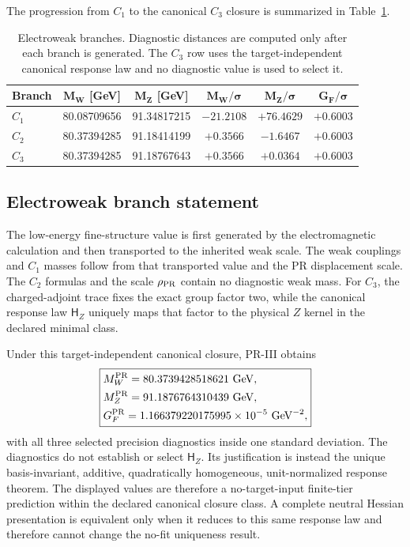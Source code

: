 \documentclass[11pt]{article}
\begin{document}
The progression from \(C_1\) to the canonical \(C_3\) closure is summarized in
Table~\ref{tab:priii-ew-closure-branches}.

\begin{table}[htbp]
\centering
\caption{Electroweak branches.  Diagnostic distances are computed only after each branch is generated.  The \(C_3\) row uses the target-independent canonical response law and no diagnostic value is used to select it.}
\label{tab:priii-ew-closure-branches}
\begin{tabular}{lccccc}
\toprule
\textbf{Branch}
& \(\boldsymbol{M_W}\) [GeV]
& \(\boldsymbol{M_Z}\) [GeV]
& \(\boldsymbol{M_W/\sigma}\)
& \(\boldsymbol{M_Z/\sigma}\)
& \(\boldsymbol{G_F/\sigma}\) \\
\midrule
\(C_1\)
& 80.08709656
& 91.34817215
& \(-21.2108\)
& \(+76.4629\)
& \(+0.6003\) \\
\(C_2\)
& 80.37394285
& 91.18414199
& \(+0.3566\)
& \(-1.6467\)
& \(+0.6003\) \\
\(C_3\)
& 80.37394285
& 91.18767643
& \(+0.3566\)
& \(+0.0364\)
& \(+0.6003\) \\
\bottomrule
\end{tabular}
\end{table}

\subsection{Electroweak branch statement}
\label{subsec:priii-ew-closure-statement}

The low-energy fine-structure value is first generated by the electromagnetic calculation and then transported to the inherited weak scale.  The weak couplings and \(C_1\) masses follow from that transported value and the PR displacement scale.  The \(C_2\) formulas and the scale \(\rho_{\rm PR}\) contain no diagnostic weak mass.  For \(C_3\), the charged-adjoint trace fixes the exact group factor two, while the canonical response law \(\mathsf H_Z\) uniquely maps that factor to the physical \(Z\) kernel in the declared minimal class.

Under this target-independent canonical closure, PR-III obtains
\begin{equation}
\boxed{
\begin{split}
{} & M_W^{\rm PR}=80.3739428518621\ {\rm GeV},\\
& M_Z^{\rm PR}=91.1876764310439\ {\rm GeV},\\
& G_F^{\rm PR}=1.166379220175995\times10^{-5}\ {\rm GeV}^{-2},
\end{split}}
\end{equation}
with all three selected precision diagnostics inside one standard deviation. The diagnostics do not establish or select \(\mathsf H_Z\).  Its justification is instead the unique basis-invariant, additive, quadratically homogeneous, unit-normalized response theorem.  The displayed values are therefore a no-target-input finite-tier prediction within the declared canonical closure class.  A complete neutral Hessian presentation is equivalent only when it reduces to this same response law and therefore cannot change the no-fit uniqueness result.
\end{document}
